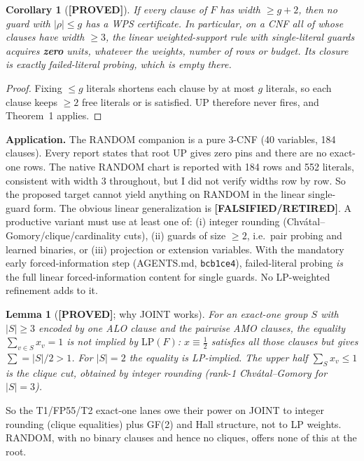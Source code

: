 \documentclass[11pt]{article}
\newtheorem{lemma}{Lemma}
\newtheorem{corollary}{Corollary}
\theoremstyle{definition}
\newcommand{\lab}[1]{\textbf{[#1]}}
\begin{document}
\begin{corollary}[\lab{PROVED}]
If every clause of $F$ has width $\ge g+2$, then no guard with $|\rho|\le g$ has a WPS
certificate. In particular, on a CNF all of whose clauses have width $\ge3$, the linear
weighted-support rule with single-literal guards acquires \textbf{zero} units, whatever
the weights, number of rows or budget. Its closure is exactly failed-literal probing,
which is empty there.
\end{corollary}
\begin{proof}
Fixing $\le g$ literals shortens each clause by at most $g$ literals, so each clause
keeps $\ge2$ free literals or is satisfied. UP therefore never fires, and Theorem~1
applies.
\end{proof}
\textbf{Application.} The RANDOM companion is a pure 3-CNF (40 variables, 184
clauses). Every report states that root UP gives zero pins and there are no exact-one rows.
The native RANDOM chart is reported with 184 rows and 552 literals, consistent with
width 3 throughout, but I did not verify widths row by row. So the proposed target
cannot yield anything on RANDOM in the linear single-guard form. The obvious linear
generalization is \lab{FALSIFIED/RETIRED}. A productive variant must use at least one of:
(i) integer rounding (Chv\'atal--Gomory/clique/cardinality cuts), (ii) guards of size
$\ge2$, i.e.\ pair probing and learned binaries, or (iii) projection or extension
variables. With the mandatory early forced-information step (AGENTS.md, \texttt{bcb1ce4}),
failed-literal probing \emph{is} the full linear forced-information content for single
guards. No LP-weighted refinement adds to it.

\begin{lemma}[\lab{PROVED}; why JOINT works]
For an exact-one group $S$ with $|S|\ge3$ encoded by one ALO clause and the pairwise AMO
clauses, the equality $\sum_{v\in S}x_v=1$ is not implied by $\mathrm{LP}(F)$:
$x\equiv\tfrac12$ satisfies all those clauses but gives $\sum=|S|/2>1$. For $|S|=2$ the
equality is LP-implied. The upper half $\sum_S x_v\le1$ is the clique cut, obtained by
integer rounding (rank-1 Chv\'atal--Gomory for $|S|=3$).
\end{lemma}
So the T1/FP55/T2 exact-one lanes owe their power on JOINT to integer rounding (clique
equalities) plus GF(2) and Hall structure, not to LP weights. RANDOM, with no binary
clauses and hence no cliques, offers none of this at the root.
\end{document}
